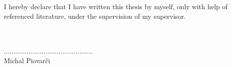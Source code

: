 \thispagestyle{empty}
\null
\vfill
\begin{flushleft}
I hereby declare that I have written this thesis by myself, only
with help of referenced literature, under the supervision of my
supervisor.
~\\
~\\
~\\
\end{flushleft}
\begin{flushright}
...............................................~~~~~~~~~~~~~~~~~~
\\
Michal Piovar\v{c}i~~~~~~~~~~~~~~~~~~~~~~~~~~
~\\
~\\
~\\
~\\
\end{flushright}